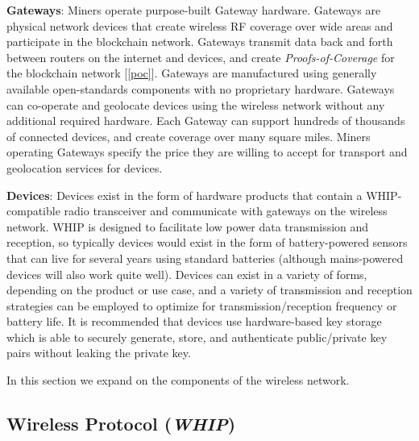 \documentclass[letterpaper,11pt]{article}
\begin{document}
\textbf{Gateways}: Miners operate purpose-built Gateway hardware. Gateways are physical network devices that create wireless RF coverage over wide areas and participate in the blockchain network. Gateways transmit data back and forth between routers on the internet and devices, and create \textit{Proofs-of-Coverage} for the blockchain network [\ref{poc}]. Gateways are manufactured using generally available open-standards components with no proprietary hardware. Gateways can co-operate and geolocate devices using the wireless network without any additional required hardware. Each Gateway can support hundreds of thousands of connected devices, and create coverage over many square miles. Miners operating Gateways specify the price they are willing to accept for transport and geolocation services for devices.\newline

\textbf{Devices}: Devices exist in the form of hardware products that contain a WHIP-compatible radio transceiver and communicate with gateways on the wireless network. WHIP is designed to facilitate low power data transmission and reception, so typically devices would exist in the form of battery-powered sensors that can live for several years using standard batteries (although mains-powered devices will also work quite well). Devices can exist in a variety of forms, depending on the product or use case, and a variety of transmission and reception strategies can be employed to optimize for transmission/reception frequency or battery life. It is recommended that devices use hardware-based key storage which is able to securely generate, store, and authenticate public/private  key pairs without leaking the private key.\newline

In this section we expand on the components of the wireless network.

\subsection{Wireless Protocol (\textit{WHIP})} \label{whip}
\end{document}
